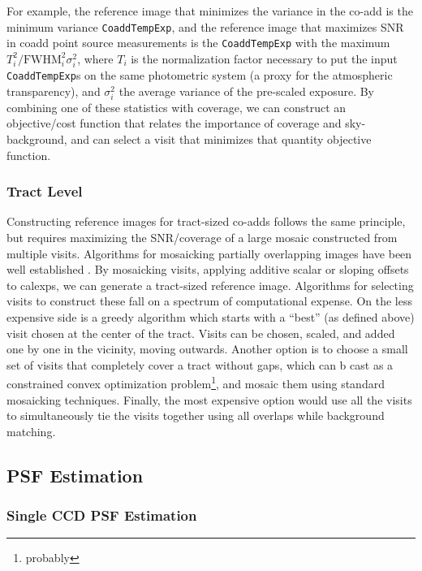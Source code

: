 For example, the reference image that minimizes the variance in the co-add is the minimum variance \texttt{CoaddTempExp}, and
the reference image that maximizes SNR in coadd point source measurements is the \texttt{CoaddTempExp} with the maximum
$T^2_i/\mathrm{FWHM}^2_i \sigma^2_i$, where $T_i$ is
the normalization factor necessary to put the input \texttt{CoaddTempExp}s on the same photometric system (a proxy for the atmospheric transparency),
and $\sigma^2_i$ the average variance of the pre-scaled exposure.  By combining one of
these statistics with coverage, we can construct an objective/cost function that relates the importance of
coverage and sky-background, and can select a visit that minimizes that quantity objective function.

\subsubsection{Tract Level}
Constructing reference images for tract-sized co-adds follows the same principle, but requires maximizing the
SNR/coverage of a large mosaic constructed from multiple visits.  Algorithms for mosaicking partially
overlapping images have been well established \citep[e.g.][]{2014AJ....147..109S, 2008ASPC..394...83B}. By mosaicking visits,
applying additive scalar or sloping offsets to calexps, we can generate a tract-sized reference image.
Algorithms for selecting visits to construct these fall on a spectrum of computational expense. On the less
expensive side is a greedy algorithm which starts with a ``best'' (as defined above) visit chosen at the
center of the tract.  Visits can be chosen, scaled, and added one by one in the vicinity, moving outwards.
Another option is to choose a small set of visits that completely cover a tract without gaps, which can b
cast as a constrained convex optimization problem\footnote{probably}, and mosaic them using standard
mosaicking techniques.  Finally, the most expensive option would use all the visits to simultaneously tie the
visits together using all overlaps while background matching.

\subsection{PSF Estimation}
\label{sec:acPSFEstimation}

\subsubsection{Single CCD PSF Estimation}
\label{sec:acSingleCCDPSF}


